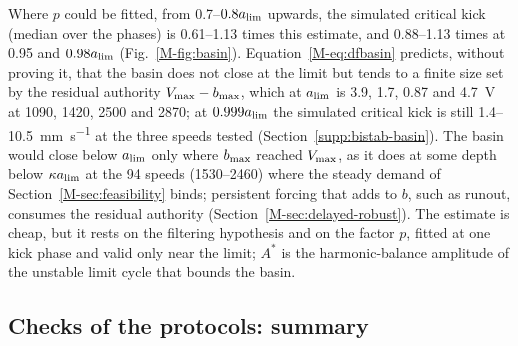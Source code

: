 Where $p$ could be fitted, from 0.7--$0.8a_{\lim}$ upwards, the simulated critical kick (median over the phases) is 0.61--1.13 times this estimate, and 0.88--1.13 times at 0.95 and $0.98a_{\lim}$ (Fig.~\ref{M-fig:basin}). Equation~\eqref{M-eq:dfbasin} predicts, without proving it, that the basin does not close at the limit but tends to a finite size set by the residual authority $V_{\max}-b_{\max}$, which at $a_{\lim}$ is 3.9, 1.7, 0.87 and \SI{4.7}{\volt} at 1090, 1420, 2500 and \SI{2870}{\rpm}; at $0.999a_{\lim}$ the simulated critical kick is still 1.4--\SI{10.5}{\milli\metre\per\second} at the three speeds tested (Section~\ref{supp:bistab-basin}). The basin would close below $a_{\lim}$ only where $b_{\max}$ reached $V_{\max}$, as it does at some depth below $\kappa a_{\lim}$ at the 94 speeds (1530--\SI{2460}{\rpm}) where the steady demand of Section~\ref{M-sec:feasibility} binds; persistent forcing that adds to $b$, such as runout, consumes the residual authority (Section~\ref{M-sec:delayed-robust}). The estimate is cheap, but it rests on the filtering hypothesis and on the factor $p$, fitted at one kick phase and valid only near the limit; $A^*$ is the harmonic-balance amplitude of the unstable limit cycle that bounds the basin.

\subsection{Checks of the protocols: summary}\label{supp:std-bistab-checks}

